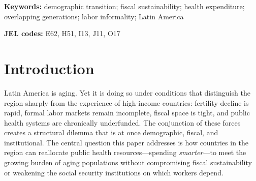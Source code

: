 \documentclass[12pt,a4paper]{article}
\begin{document}
\begin{abstract}
Latin America is aging before it has grown rich, and the fiscal pressure this places on health and pension systems is sharpened by persistent labor informality and limited fiscal space. We develop a stochastic overlapping-generations model with endogenous health investment, agents heterogeneous in sex and skill, and a pay-as-you-go pension system whose contribution rate clears endogenously. Health capital depreciates with age, raises survival, productivity, and the amenity value of consumption, and is restored through medical spending, so it links longevity to the contribution rate through a fiscal amplification loop whose net sign is ambiguous. The model is designed for M\'exico, Costa Rica, and Panam\'a; this version reports the Mexican calibration, estimating the labor-efficiency profile and skill premium from ENOE micro-data and the remaining preference and health-technology parameters by simulated method of moments. Three findings follow. At M\'exico's projected 2050 demographics, the 2020 contribution rate and benefit formula open a pension financing gap that no finite stationary stock of public debt can close, narrowing the menu of feasible long-run responses below what the policy debate assumes. The calibrated capital stock is governed first by the persistence of idiosyncratic income risk and only second by skill composition. And a replacement-rate cut is regressive, while under unchanged policy the equilibrium contribution rate rises from 9.3\% to 15.9\% as the population ages.
\end{abstract}

\noindent\textbf{Keywords:} demographic transition; fiscal sustainability; health expenditure; overlapping generations; labor informality; Latin America

\noindent\textbf{JEL codes:} E62, H51, I13, J11, O17

\section{Introduction}
\label{sec:intro}

Latin America is aging. Yet it is doing so under conditions that distinguish the region sharply from the experience of high-income countries: fertility decline is rapid, formal labor markets remain incomplete, fiscal space is tight, and public health systems are chronically underfunded. The conjunction of these forces creates a structural dilemma that is at once demographic, fiscal, and institutional. The central question this paper addresses is how countries in the region can reallocate public health resources---spending \textit{smarter}---to meet the growing burden of aging populations without compromising fiscal sustainability or weakening the social security institutions on which workers depend.
\end{document}
